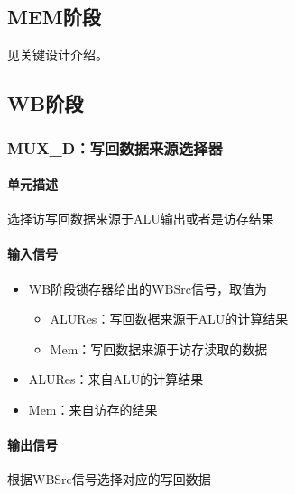\documentclass{article}
\begin{document}
		
\subsection{MEM阶段}
见关键设计介绍。

\subsection{WB阶段}
		
\subsubsection{MUX\_D：写回数据来源选择器}
		
\paragraph{单元描述}
选择访写回数据来源于ALU输出或者是访存结果
		
\paragraph{输入信号}
\begin{itemize}
\item WB阶段锁存器给出的WBSrc信号，取值为
		\begin{itemize}
			\item ALURes：写回数据来源于ALU的计算结果
			\item Mem：写回数据来源于访存读取的数据
		\end{itemize}
\item ALURes：来自ALU的计算结果
\item Mem：来自访存的结果
\end{itemize}
\paragraph{输出信号}
根据WBSrc信号选择对应的写回数据
		
\end{document}
